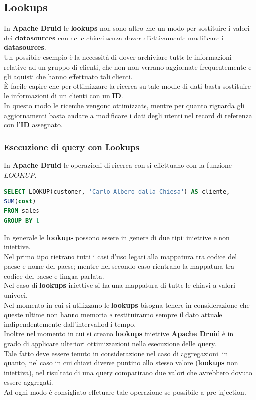 \documentclass{article}
\begin{document}
\subsection{Lookups}
In \textbf{Apache Druid} le \textbf{lookups} non sono altro che un modo per sostituire i valori dei \textbf{datasources} con delle chiavi senza dover effettivamente modificare i \textbf{datasources}. \\
Un possibile esempio è la necessità di dover archiviare tutte le informazioni relative ad un gruppo di clienti, che non non verrano aggiornate frequentemente e gli aquisti che hanno effettuato tali clienti.\\
È facile capire che per ottimizzare la ricerca su tale modle di dati basta sostituire le informazioni di un clienti con un \textbf{ID}.\\ In questo modo le ricerche vengono ottimizzate, mentre per quanto riguarda gli aggiornamenti basta andare a modificare i dati degli utenti nel record di referenza con l'\textbf{ID} assegnato.
\subsubsection{Esecuzione di query con Lookups}
In \textbf{Apache Druid} le operazioni di ricerca con si effettuano con la funzione $LOOKUP$.
\begin{lstlisting}[language=SQL,showstringspaces=false,]
SELECT LOOKUP(customer, 'Carlo Albero dalla Chiesa') AS cliente, 
SUM(cost)
FROM sales
GROUP BY 1
\end{lstlisting}
In generale le \textbf{lookups} possono essere in genere di due tipi: iniettive e non iniettive. \\
Nel primo tipo rietrano tutti i casi d'uso legati alla mappatura tra codice del paese e nome del paese; mentre nel secondo caso rientrano la mappatura tra codice del paese e lingua parlata.\\
Nel caso di \textbf{lookups} iniettive si ha una mappatura di tutte le chiavi a valori univoci.\\
Nel momento in cui si utilizzano le \textbf{lookups} bisogna tenere in considerazione che queste ultime non hanno memoria e restituiranno sempre il dato attuale indipendentemente dall'intervallod i tempo.\\
Inoltre nel momento in cui si creano \textbf{lookups} iniettive \textbf{Apache Druid} è in grado di applicare ulteriori ottimizzazioni nella esecuzione delle query.
\\Tale fatto deve essere tenuto in considerazione nel caso di aggregazioni, in quanto, nel caso in cui chiavi diverse puntino allo stesso valore (\textbf{lookups} non iniettiva), nel risultato di una query comparirano due valori che avrebbero dovuto essere aggregati.\\
Ad ogni modo è consigliato effetuare tale operazione se possibile a pre-injection.
\end{document}
